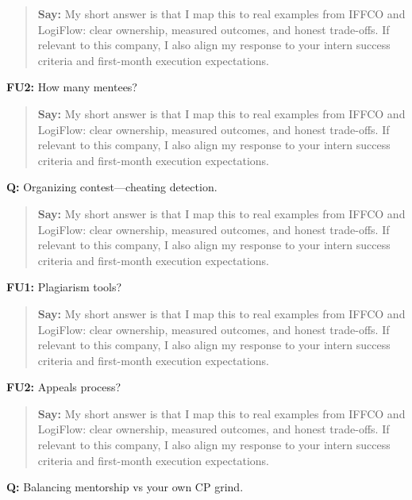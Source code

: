 \documentclass[9pt,a4paper]{article}
\begin{document}
\begin{quote}\small\textbf{Say:} My short answer is that I map this to real examples from IFFCO and LogiFlow: clear ownership, measured outcomes, and honest trade-offs. If relevant to this company, I also align my response to your intern success criteria and first-month execution expectations.\end{quote}
\vspace{2mm}
\textbf{FU2:} How many mentees?

\begin{quote}\small\textbf{Say:} My short answer is that I map this to real examples from IFFCO and LogiFlow: clear ownership, measured outcomes, and honest trade-offs. If relevant to this company, I also align my response to your intern success criteria and first-month execution expectations.\end{quote}
\vspace{2mm}
\textbf{Q:} Organizing contest---cheating detection.

\begin{quote}\small\textbf{Say:} My short answer is that I map this to real examples from IFFCO and LogiFlow: clear ownership, measured outcomes, and honest trade-offs. If relevant to this company, I also align my response to your intern success criteria and first-month execution expectations.\end{quote}
\vspace{2mm}
\textbf{FU1:} Plagiarism tools?

\begin{quote}\small\textbf{Say:} My short answer is that I map this to real examples from IFFCO and LogiFlow: clear ownership, measured outcomes, and honest trade-offs. If relevant to this company, I also align my response to your intern success criteria and first-month execution expectations.\end{quote}
\vspace{2mm}
\textbf{FU2:} Appeals process?

\begin{quote}\small\textbf{Say:} My short answer is that I map this to real examples from IFFCO and LogiFlow: clear ownership, measured outcomes, and honest trade-offs. If relevant to this company, I also align my response to your intern success criteria and first-month execution expectations.\end{quote}
\vspace{2mm}
\textbf{Q:} Balancing mentorship vs your own CP grind.
\end{document}
